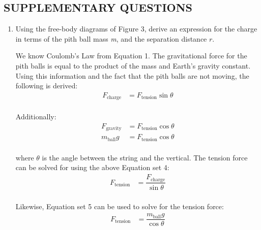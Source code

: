 \documentclass [12pt, letterpaper, twoside]{article}
\begin{document}
\subsection*{SUPPLEMENTARY QUESTIONS}
\begin{enumerate}
  \item{Using the free-body diagrams of Figure 3, derive an expression for the charge in terms of the pith ball mass \emph{m}, and the separation distance \(r\).}

    We know Coulomb's Law from Equation 1. The gravitational force for the pith balls is equal to the product of the mass and Earth's gravity constant. Using this information and the fact that the pith balls are not moving, the following is derived:
    \begin{equation*}
      \begin{split}
        F_{\text{charge}} &= F_{\text{tension}}\sin{\theta} \\
      \end{split}
    \end{equation*}

    \noindent
    Additionally:
    \begin{equation}
      \begin{split}
        F_{\text{gravity}} &= F_{\text{tension}}\cos{\theta} \\
        m_{\text{ball}}g &= F_{\text{tension}}\cos{\theta} \\
      \end{split}
    \end{equation}

    \noindent
    where \(\theta\) is the angle between the string and the vertical. The tension force can be solved for using the above Equation set 4:
    \begin{equation}
      \begin{split}
        F_{\text{tension}} &= \dfrac{F_{\text{charge}}}{\sin{\theta}} \\
      \end{split}
    \end{equation}

    \noindent
    Likewise, Equation set 5 can be used to solve for the tension force:
    \begin{equation}
      \begin{split}
        F_{\text{tension}} &= \dfrac{m_{\text{ball}}g}{\cos{\theta}}
      \end{split}
    \end{equation}


\end{enumerate}
\end{document}
